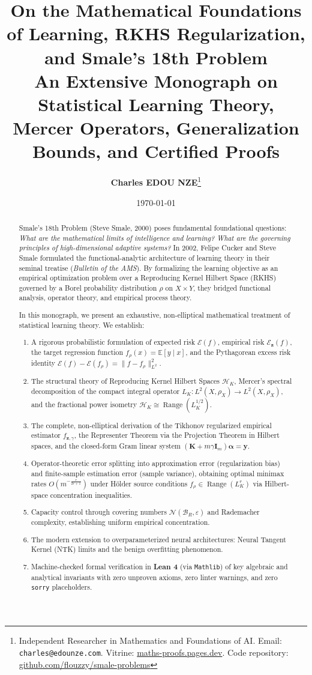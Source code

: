 \documentclass[11pt,a4paper]{article}
\title{\textbf{\Large On the Mathematical Foundations of Learning, RKHS Regularization, and Smale's 18th Problem}\\[0.5em]
\large An Extensive Monograph on Statistical Learning Theory, Mercer Operators, Generalization Bounds, and Certified Proofs}
\author{\textbf{Charles EDOU NZE}\thanks{Independent Researcher in Mathematics and Foundations of AI. Email: \texttt{charles@edounze.com}. Vitrine: \href{https://maths-proofs.pages.dev}{maths-proofs.pages.dev}. Code repository: \href{https://github.com/flouzzy/smale-problems}{github.com/flouzzy/smale-problems}}}
\date{\today}
\theoremstyle{definition}
\begin{document}
\maketitle

\begin{abstract}
Smale's 18th Problem (Steve Smale, 2000) poses fundamental foundational questions: \emph{What are the mathematical limits of intelligence and learning? What are the governing principles of high-dimensional adaptive systems?}
In 2002, Felipe Cucker and Steve Smale formulated the functional-analytic architecture of learning theory in their seminal treatise (\textit{Bulletin of the AMS}). By formalizing the learning objective as an empirical optimization problem over a Reproducing Kernel Hilbert Space (RKHS) governed by a Borel probability distribution $\rho$ on $X \times Y$, they bridged functional analysis, operator theory, and empirical process theory.

In this monograph, we present an exhaustive, non-elliptical mathematical treatment of statistical learning theory. We establish:
\begin{enumerate}
    \item A rigorous probabilistic formulation of expected risk $\mathcal{E}(f)$, empirical risk $\mathcal{E}_{\mathbf{z}}(f)$, the target regression function $f_\rho(x) = \mathbb{E}[y \mid x]$, and the Pythagorean excess risk identity $\mathcal{E}(f) - \mathcal{E}(f_\rho) = \|f - f_\rho\|_{L^2}^2$.
    \item The structural theory of Reproducing Kernel Hilbert Spaces $\mathcal{H}_K$, Mercer's spectral decomposition of the compact integral operator $L_K: L^2(X, \rho_X) \to L^2(X, \rho_X)$, and the fractional power isometry $\mathcal{H}_K \cong \operatorname{Range}(L_K^{1/2})$.
    \item The complete, non-elliptical derivation of the Tikhonov regularized empirical estimator $f_{\mathbf{z}, \gamma}$, the Representer Theorem via the Projection Theorem in Hilbert spaces, and the closed-form Gram linear system $(\mathbf{K} + m \gamma \mathbf{I}_m)\boldsymbol{\alpha} = \mathbf{y}$.
    \item Operator-theoretic error splitting into approximation error (regularization bias) and finite-sample estimation error (sample variance), obtaining optimal minimax rates $O(m^{-\frac{r}{2r+1}})$ under H\"older source conditions $f_\rho \in \operatorname{Range}(L_K^r)$ via Hilbert-space concentration inequalities.
    \item Capacity control through covering numbers $\mathcal{N}(\mathcal{B}_R, \varepsilon)$ and Rademacher complexity, establishing uniform empirical concentration.
    \item The modern extension to overparameterized neural architectures: Neural Tangent Kernel (NTK) limits and the benign overfitting phenomenon.
    \item Machine-checked formal verification in \textbf{Lean 4} (via \texttt{Mathlib}) of key algebraic and analytical invariants with zero unproven axioms, zero linter warnings, and zero \texttt{sorry} placeholders.
\end{enumerate}
\end{abstract}
\end{document}

